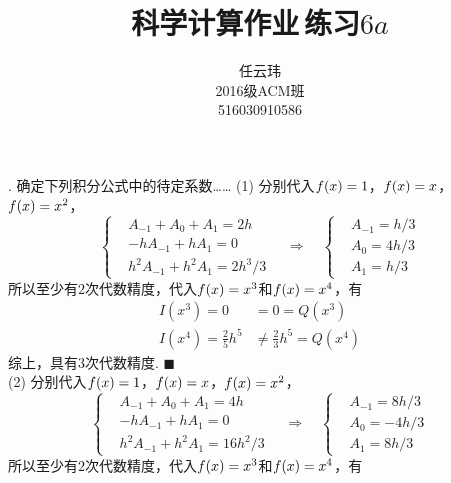 

\title{科学计算作业$\,$练习$6a$}
\author{\small 任云玮\\\small2016级ACM班\\\small516030910586}
\date{}


\maketitle

. 确定下列积分公式中的待定系数……
\ans
  (1) 分别代入$\mathnormal{f}(x) = 1$，$\mathnormal{f}(x) = x$，$\mathnormal{f}(x) = x^2$，
  \[
   \begin{cases}
     &A_{-1} + A_0 + A_1 = 2h \\
     &-hA_{-1} + hA_1 = 0 \\
     &h^2A_{-1} + h^2A_1 = 2h^3/3
   \end{cases}
   \quad\Rightarrow\quad
   \begin{cases}
     & A_{-1} = h/3 \\
     & A_0 = 4h/3 \\
     & A_1 = h/3
   \end{cases}
  \]
  所以至少有$2$次代数精度，代入$\mathnormal{f}(x) = x^3$和$\mathnormal{f}(x) = x^4$，有
  \[\begin{split}
    I(x^3) = 0 &= 0 = Q(x^3) \\
    I(x^4) = \frac{2}{5}h^5 &\ne \frac{2}{3}h^5 = Q(x^4)
  \end{split}\]
  综上，具有$3$次代数精度. $\blacksquare$\\
  (2) 分别代入$\mathnormal{f}(x) = 1$，$\mathnormal{f}(x) = x$，$\mathnormal{f}(x) = x^2$，
  \[\begin{cases}
    &A_{-1} + A_0 + A_1 = 4h \\
    &-hA_{-1} + hA_1 = 0 \\
    &h^2A_{-1} + h^2A_1 = 16h^2/3
    \end{cases}
    \quad\Rightarrow\quad
    \begin{cases}
      & A_{-1} = 8h/3 \\
      & A_0 = -4h/3 \\
      & A_1 = 8h/3
    \end{cases}
  \]
  所以至少有$2$次代数精度，代入$\mathnormal{f}(x)=x^3$和$\mathnormal{f}(x)=x^4$，有
